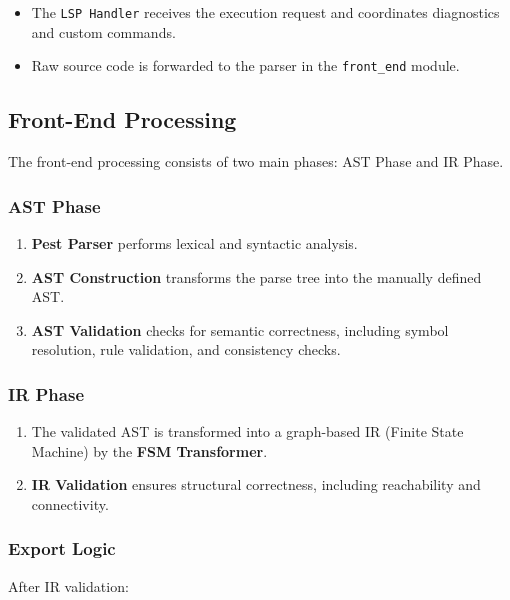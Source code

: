 \documentclass[a4paper,11pt]{article}
\begin{document}
\begin{itemize}
    \item The \texttt{LSP Handler} receives the execution request and coordinates
          diagnostics and custom commands.
    \item Raw source code is forwarded to the parser in the \texttt{front\_end} module.
\end{itemize}

\subsection{Front-End Processing}

The front-end processing consists of two main phases: AST Phase and IR Phase.

\subsubsection{AST Phase}

\begin{enumerate}
    \item \textbf{Pest Parser} performs lexical and syntactic analysis.
    \item \textbf{AST Construction} transforms the parse tree into the manually defined AST.
    \item \textbf{AST Validation} checks for semantic correctness, including symbol resolution,
          rule validation, and consistency checks.
\end{enumerate}

\subsubsection{IR Phase}

\begin{enumerate}
    \item The validated AST is transformed into a graph-based IR (Finite State Machine)
          by the \textbf{FSM Transformer}.
    \item \textbf{IR Validation} ensures structural correctness, including reachability and
          connectivity.
\end{enumerate}

\subsubsection{Export Logic}

After IR validation:
\end{document}
